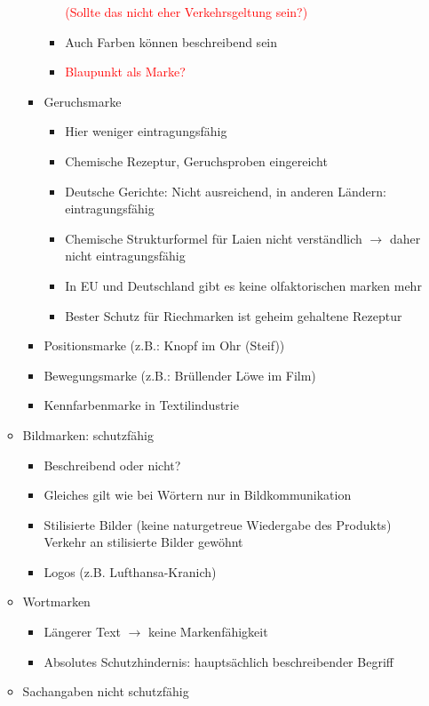 \documentclass{report}
\begin{document}
\begin{itemize}
\begin{itemize}
\begin{itemize}
\begin{itemize}
				\newline \textcolor{red}{(Sollte das nicht eher Verkehrsgeltung sein?)}
				\item Auch Farben können beschreibend sein
				\item \textcolor{red}{Blaupunkt als Marke?}
			\end{itemize}
			\item Geruchsmarke
			\begin{itemize}
				\item Hier weniger eintragungsfähig
				\item Chemische Rezeptur, Geruchsproben eingereicht
				\item Deutsche Gerichte: Nicht ausreichend, in anderen Ländern: eintragungsfähig
				\item Chemische Strukturformel für Laien nicht verständlich $\rightarrow$ daher nicht eintragungsfähig
				\item In EU und Deutschland gibt es keine olfaktorischen marken mehr
				\item Bester Schutz für Riechmarken ist geheim gehaltene Rezeptur
			\end{itemize}
			\item Positionsmarke (z.B.: Knopf im Ohr (Steif))
			\item Bewegungsmarke (z.B.: Brüllender Löwe im Film)
			\item Kennfarbenmarke in Textilindustrie
		\end{itemize}
		\item Bildmarken: schutzfähig
		\begin{itemize}
			\item Beschreibend oder nicht?
			\item Gleiches gilt wie bei Wörtern nur in Bildkommunikation
			\item Stilisierte Bilder (keine naturgetreue Wiedergabe des Produkts)
			\newline Verkehr an stilisierte Bilder gewöhnt
			\item Logos (z.B. Lufthansa-Kranich)
		\end{itemize}
		\item Wortmarken
		\begin{itemize}
			\item Längerer Text $\rightarrow$ keine Markenfähigkeit
			\item Absolutes Schutzhindernis: hauptsächlich beschreibender Begriff
		\end{itemize}
		\item Sachangaben nicht schutzfähig

\end{itemize}
\end{itemize}
\end{document}
